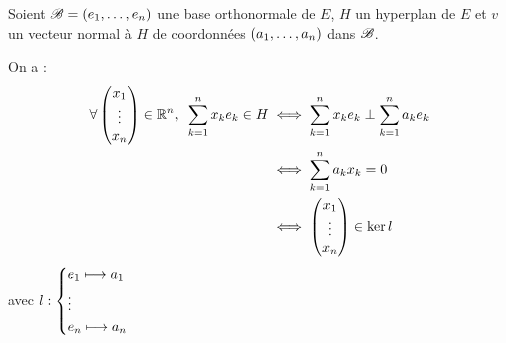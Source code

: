 \begin{dem}
Soient \(\fami{B}=\paren{e_1,\dots,e_n}\) une base orthonormale de \(E\), \(H\) un hyperplan de \(E\) et \(v\) un vecteur normal à \(H\) de coordonnées \(\paren{a_1,\dots,a_n}\) dans \(\fami{B}\).

On a : \[\begin{aligned}
\quantifs{\forall\tcoords{x_1}{\vdots}{x_n}\in\R^n}\sum_{k=1}^{n}x_ke_k\in H&\ssi\sum_{k=1}^{n}x_ke_k\perp\sum_{k=1}^{n}a_ke_k \\
&\ssi\sum_{k=1}^{n}a_kx_k=0 \\
&\ssi\tcoords{x_1}{\vdots}{x_n}\in\ker l
\end{aligned}\] avec \(l:\begin{dcases}
e_1\mapsto a_1 \\
\vdots \\
e_n\mapsto a_n
\end{dcases}\)
\end{dem}